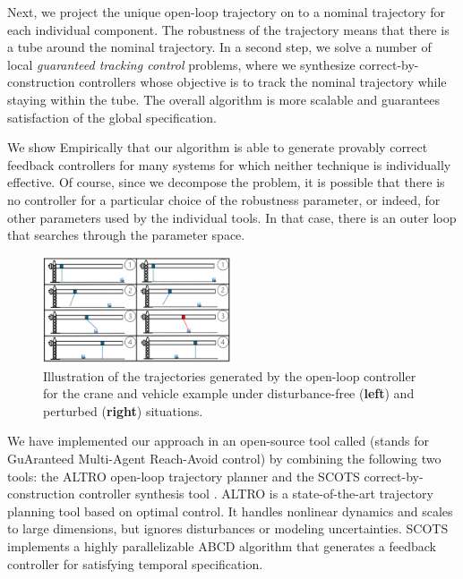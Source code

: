 Next, we project the unique open-loop trajectory on to a nominal trajectory for each individual component.
The robustness of the trajectory means that there is a tube around the nominal trajectory.
In a second step, we solve a number of local \emph{guaranteed tracking control} problems, where we synthesize correct-by-construction
controllers whose objective is to track the nominal trajectory while staying within the tube.
The overall algorithm is more scalable and guarantees satisfaction of the global specification.

We show Empirically that our algorithm is able to generate provably correct feedback controllers for many
systems for which neither technique is individually effective.
Of course, since we decompose the problem, it is possible that there is no controller for a particular choice of the
robustness parameter, or indeed, for other parameters used by the individual tools.
In that case, there is an outer loop that searches through the parameter space.


\begin{figure}[t]
	\centering
	\includegraphics[width=0.5\textwidth]{figures/updated_crane.pdf}
	\caption{Illustration of the trajectories generated by the open-loop controller for the crane and vehicle example under disturbance-free (\textbf{left}) and perturbed (\textbf{right}) situations.}
	\label{fig:cr_and_lft}
\end{figure}




We have implemented our approach in an open-source tool called \tool (stands for GuAranteed Multi-Agent Reach-Avoid control)
by combining the following two tools: the ALTRO open-loop trajectory planner \cite{howell2019altro} and the 
SCOTS correct-by-construction controller synthesis tool \cite{Rungger2016scots}. 
ALTRO is a state-of-the-art trajectory planning tool based on optimal control.
It handles nonlinear dynamics and scales to large dimensions, but ignores disturbances or modeling uncertainties.
SCOTS implements a highly parallelizable ABCD algorithm that generates a feedback controller for satisfying temporal specification.

